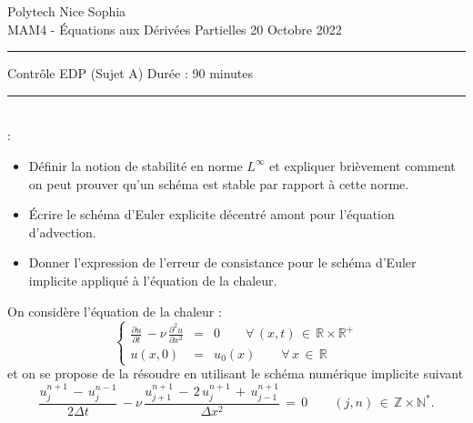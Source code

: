 \documentclass[12pt,a4paper]{article}
\begin{document}
 \hfill Polytech Nice Sophia\\
\noindent MAM4 - \'Equations aux D\'eriv\'ees Partielles \hfill 
20 Octobre 2022 \\

\hrule

\vspace{0.8cm}
\centerline {\large \sc Contrôle EDP (Sujet A) Dur\'ee : 90 minutes}
\vspace{0.8cm}


\hrule
\vspace{0.5cm}
\\

:
\begin{itemize}
\item Définir la notion de stabilité en norme $L^{\infty}$ et expliquer brièvement comment on peut prouver qu'un schéma est stable par rapport à cette norme.
\item Écrire le schéma d'Euler explicite décentré amont pour l'équation d'advection. 
\item Donner l'expression de l'erreur de consistance pour le schéma d'Euler implicite appliqué à l'équation de la chaleur.
\end{itemize}

\vspace{0.5 cm}



\noindent On consid\`ere l'\'equation de la chaleur :
\begin{equation} \label{eqn:chaleur}
\left\{
\begin{array}{rcl}
\displaystyle \frac{\partial u}{\partial t} \, - \nu\, \frac{\partial^2 u}{\partial x^2}  & =  & 0  \qquad \forall \, (x,t) \, \in \, \mathbb{R} \times \mathbb{R}^+ \\
\displaystyle u(x,0)  & =  & u_0(x)  \qquad \forall \, x \, \in \, \mathbb{R}
\end{array}
\right.
\end{equation}
et on se propose de la r\'esoudre en utilisant le sch\'ema num\'erique implicite suivant
\begin{equation} \label{eqn:schema2}
\displaystyle  \frac{u_j^{n+1} \, - \, u_j^{n-1}}{2 \Delta t} \, - \nu\,  \frac{u_{j+1}^{n+1} \,- \,  2 \, u_j^{n+1} \, + \, u_{j-1}^{n+1}}{\Delta x ^2 } \,  =  \,   0 \qquad (j,n) \, \in \, \mathbb{Z} \times \mathbb{N}^* .
\end{equation}
\end{document}

